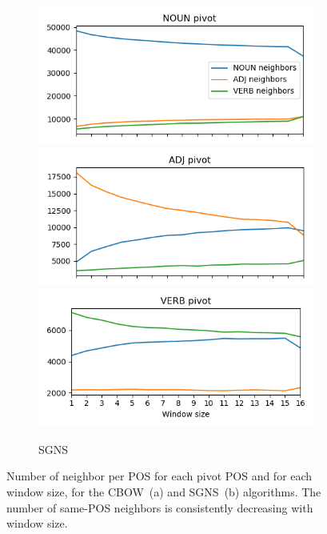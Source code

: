\documentclass[11pt,a4paper]{article}
\begin{document}
\begin{figure}[h]
\begin{subfigure}[b]{.5\textwidth}
        \includegraphics[width=\textwidth]{figs/NOUN_nn_100_fasttext_enwiki-20170501-clean_skipgram-300d-min500_pos.png}
        \includegraphics[width=\textwidth]{figs/ADJ_nn_100_fasttext_enwiki-20170501-clean_skipgram-300d-min500_pos.png}
        \includegraphics[width=\textwidth]{figs/VERB_nn_100_fasttext_enwiki-20170501-clean_skipgram-300d-min500_pos.png}
        \caption{SGNS}
        \end{subfigure}
        \caption{Number of neighbor per POS for each pivot POS and for each window size,
        for the CBOW~(a) and SGNS~(b) algorithms.
        The number of same-POS neighbors is consistently decreasing with window size.
        \label{fig:nn_pos_hist}}
    \end{figure}
    
\end{document}
